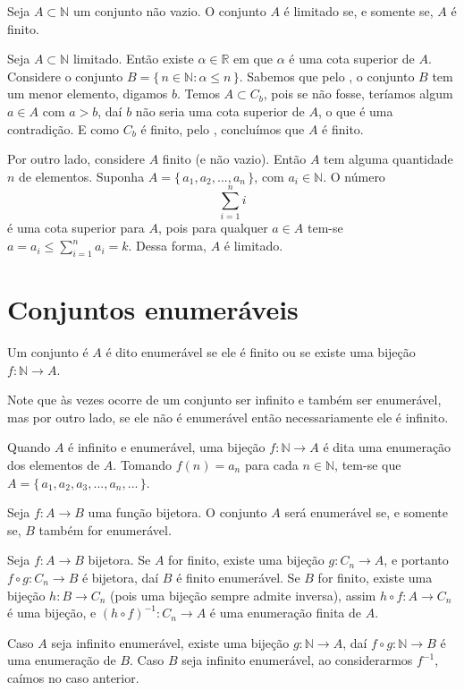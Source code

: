 \documentclass[../main.tex]{subfiles}
\begin{document}
\begin{teo}\label{enum-teo-finitoLimitado}
    Seja $A \subset \mathbb{N}$ um conjunto não vazio. O conjunto $A$ é limitado se, e somente se, $A$ é finito.
\end{teo}
\begin{dem}
    Seja $A \subset \mathbb{N}$ limitado. Então existe $\alpha \in \mathbb{R}$ em que $\alpha$ é uma cota superior de $A$. Considere o conjunto $B = \{\,n \in \mathbb{N} : \alpha \leq n \,\}$.
    Sabemos que pelo , o conjunto $B$ tem um menor elemento, digamos $b$. Temos $A \subset C_b$, pois se não fosse, teríamos algum 
    $a \in A$ com $a > b$, daí $b$ não seria uma cota superior de $A$, o que é uma contradição. E como $C_b$ é finito, pelo , concluímos que $A$ é finito.

    Por outro lado, considere $A$ finito (e não vazio). Então $A$ tem alguma quantidade $n$ de elementos. Suponha $A = \{\,a_1, a_2, ..., a_n\,\}$, com $a_i \in \mathbb{N}$. O número 
    \[ \sum_{i=1}^n i \]
    é uma cota superior para $A$, pois para qualquer $a \in A$ tem-se $a = a_i \leq \sum_{i=1}^n a_i = k$. Dessa forma, $A$ é limitado.
\end{dem}

\section{Conjuntos enumeráveis}
\begin{defi}\label{enum-def-conjuntoEnumeravel}
    Um conjunto é $A$ é dito enumerável se ele é finito ou se existe uma bijeção $f: \mathbb{N} \to A$.
\end{defi}
Note que às vezes ocorre de um conjunto ser infinito e também ser enumerável, mas por outro lado, se ele não é enumerável então necessariamente ele é infinito.

Quando $A$ é infinito e enumerável, uma bijeção $f \colon \mathbb{N} \to A$ é dita uma enumeração dos elementos de $A$. Tomando $f(n) = a_n$ para cada $n \in \mathbb{N}$, tem-se que $A = \{\,a_1, a_2, a_3, ..., a_n, ...\,\}$.

\begin{prop}
    Seja $f \colon A \to B$ uma função bijetora. O conjunto $A$ será enumerável se, e somente se, $B$ também for enumerável.
\end{prop}
\begin{dem}
    Seja $f \colon A \to B$ bijetora. Se $A$ for finito, existe uma bijeção $g \colon C_n \to A$, e portanto $f \circ g \colon C_n \to B$ é bijetora, daí $B$ é finito enumerável.
    Se $B$ for finito, existe uma bijeção $h \colon B \to C_n$ (pois uma bijeção sempre admite inversa), assim $h \circ f \colon A \to C_n$ é uma bijeção, e $(h \circ f)^{-1} \colon C_n \to A$ é uma enumeração finita de $A$.

    Caso $A$ seja infinito enumerável, existe uma bijeção $g \colon \mathbb{N} \to A$, daí $f \circ g \colon \mathbb{N} \to B$ é uma enumeração de $B$.
    Caso $B$ seja infinito enumerável, ao considerarmos $f^{-1}$, caímos no caso anterior.
\end{dem}
\end{document}
